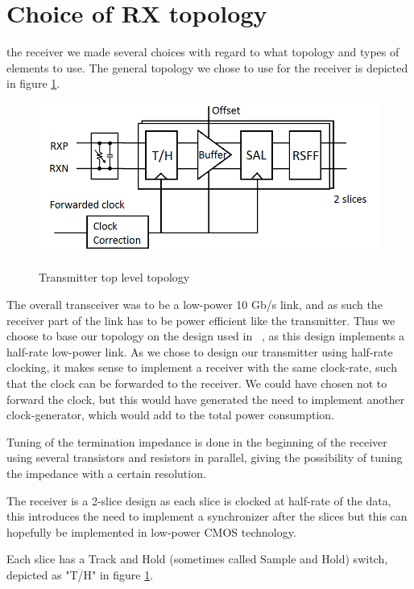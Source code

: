 \section{Choice of RX topology}

 the receiver we made several choices with regard to what topology and types of elements to use. The general topology we chose to use for the receiver is depicted in figure \ref{fig:topology}.

\begin{figure}[H]
  \centering
  {\includegraphics[scale=0.55]{img/topology.png}}
  \caption{Transmitter top level topology}
  \label{fig:topology}
\end{figure}


The overall transceiver was to be a low-power 10 Gb/s link, and as such the receiver part of the link has to be power efficient like the transmitter. Thus we choose to base our topology on the design used in ~\cite{mahony2010a}, as this design implements a half-rate low-power link. As we chose to design our transmitter using half-rate clocking, it makes sense to implement a receiver with the same clock-rate, such that the clock can be forwarded to the receiver. We could have chosen not to forward the clock, but this would have generated the need to implement another clock-generator, which would add to the total power consumption.


Tuning of the termination impedance is done in the beginning of the receiver using several transistors and resistors in parallel, giving the possibility of tuning the impedance with a certain resolution.

The receiver is a 2-slice design as each slice is clocked at half-rate of the data, this introduces the need to implement a synchronizer after the slices but this can hopefully be implemented in low-power CMOS technology.

Each slice has a Track and Hold (sometimes called Sample and Hold) switch, depicted as "T/H" in figure \ref{fig:topology}.

